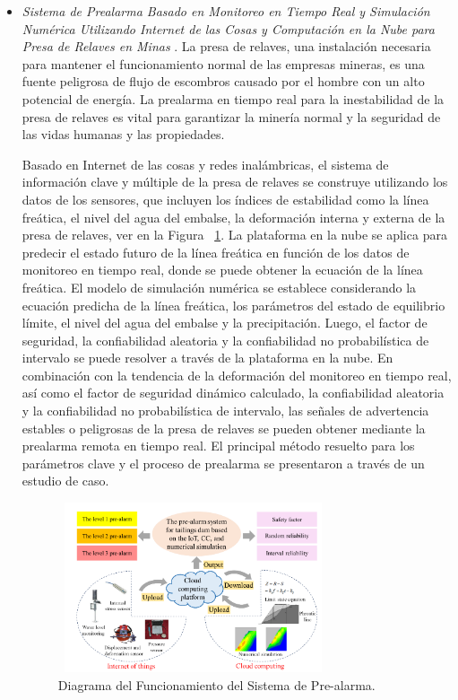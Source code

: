 \documentclass[10pt,journal]{IEEEtran}
\begin{document}
    \begin{itemize}
    \item  \textit{Sistema de Prealarma Basado en Monitoreo en Tiempo Real y Simulación Numérica Utilizando Internet de las Cosas y Computación en la Nube para Presa de Relaves en Minas} \citep{dong2017pre}. La presa de relaves, una instalación necesaria para mantener el funcionamiento normal de las empresas mineras, es una fuente peligrosa de flujo de escombros causado por el hombre con un alto potencial de energía. La prealarma en tiempo real para la inestabilidad de la presa de relaves es vital para garantizar la minería normal y la seguridad de las vidas humanas y las propiedades.
    
    Basado en Internet de las cosas y redes inalámbricas, el sistema de información clave y múltiple de la presa de relaves se construye utilizando los datos de los sensores, que incluyen los índices de estabilidad como la línea freática, el nivel del agua del embalse, la deformación interna y externa de la presa de relaves, ver en la Figura ~\ref{f56}. La plataforma en la nube se aplica para predecir el estado futuro de la línea freática en función de los datos de monitoreo en tiempo real, donde se puede obtener la ecuación de la línea freática. El modelo de simulación numérica se establece considerando la ecuación predicha de la línea freática, los parámetros del estado de equilibrio límite, el nivel del agua del embalse y la precipitación. Luego, el factor de seguridad, la confiabilidad aleatoria y la confiabilidad no probabilística de intervalo se puede resolver a través de la plataforma en la nube. En combinación con la tendencia de la deformación del monitoreo en tiempo real, así como el factor de seguridad dinámico calculado, la confiabilidad aleatoria y la confiabilidad no probabilística de intervalo, las señales de advertencia estables o peligrosas de la presa de relaves se pueden obtener mediante la prealarma remota en tiempo real. El principal método resuelto para los parámetros clave y el proceso de prealarma se presentaron a través de un estudio de caso.
    
     \begin{figure}[H]
        \begin{center}
        \includegraphics[width=8cm, height=5cm]{figuras/tailing.PNG}
        \caption{Diagrama del Funcionamiento del Sistema de Pre-alarma.}
        \label{f56} 
        \end{center}
    \end{figure}
    \end{itemize}
    
\end{document}
